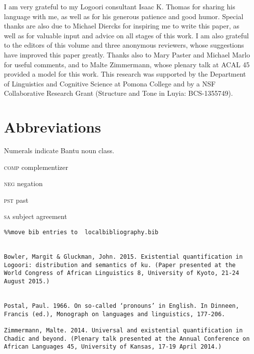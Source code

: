 \documentclass[output=paper]{langsci/langscibook}
\begin{document}
I am very grateful to my Logoori consultant Isaac K. Thomas for sharing his language with me, as well as for his generous patience and good humor. Special thanks are also due to Michael Diercks for inspiring me to write this paper, as well as for valuable input and advice on all stages of this work. I am also grateful to the editors of this volume and three anonymous reviewers, whose suggestions have improved this paper greatly. Thanks also to Mary Paster and Michael Marlo for useful comments, and to Malte Zimmermann, whose plenary talk at ACAL 45 provided a model for this work. This research was supported by the Department of Linguistics and Cognitive Science at Pomona College and by a NSF Collaborative Research Grant (Structure and Tone in Luyia: BCS-1355749).

\section*{Abbreviations}

Numerals indicate Bantu noun class.

\textsc{comp}  complementizer

\textsc{neg}  negation

\textsc{pst}  past

\textsc{sa}  subject agreement


\begin{verbatim}%%move bib entries to  localbibliography.bib


Bowler, Margit & Gluckman, John. 2015. Existential quantification in Logoori: distribution and semantics of ku. (Paper presented at the World Congress of African Linguistics 8, University of Kyoto, 21-24 August 2015.)


Postal, Paul. 1966. On so-called ‘pronouns’ in English. In Dinneen, Francis (ed.), Monograph on languages and linguistics, 177-206.

Zimmermann, Malte. 2014. Universal and existential quantification in Chadic and beyond. (Plenary talk presented at the Annual Conference on African Languages 45, University of Kansas, 17-19 April 2014.)


\end{verbatim}
 

\printbibliography[heading=subbibliography,notkeyword=this]
\end{document}
